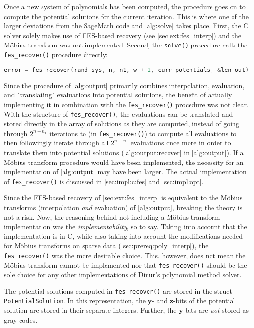 Once a new system of polynomials has been computed, the procedure goes on to compute the potential solutions for the current iteration. This is where one of the larger deviations from the SageMath code and \cref{alg:solve} takes place. First, the C solver solely makes use of FES-based recovery (see \cref{sec:ext:fes_interp}) and the Möbius transform was not implemented. Second, the \texttt{solve()} procedure calls the \texttt{fes\_recover()} procedure directly:
\begin{lstlisting}[language=c,style=mystyle]
error = fes_recover(rand_sys, n, n1, w + 1, curr_potentials, &len_out);
\end{lstlisting}

Since the procedure of \cref{alg:output} primarily combines interpolation, evaluation, and "translating" evaluations into potential solutions, the benefit of actually implementing it in combination with the \texttt{fes\_recover()} procedure was not clear. With the structure of \texttt{fes\_recover()}, the evaluations can be translated and stored directly in the array of solutions as they are computed, instead of going through $2^{n - n_1}$ iterations to (in \texttt{fes\_recover()}) to compute all evaluations to then followingly iterate through all $2^{n - n_1}$ evaluations once more in order to translate them into potential solutions (\cref{alg:output:recover} in \cref{alg:output}). If a Möbius transform procedure would have been implemented, the necessity for an implementation of \cref{alg:output} may have been larger. The actual implementation of \texttt{fes\_recover()} is discussed in \cref{sec:impl:c:fes} and \cref{sec:impl:opt}.

Since the FES-based recovery of \cref{sec:ext:fes_interp} is equivalent to the Möbius transforms (interpolation \textit{and} evaluation) of \cref{alg:output}, breaking the theory is not a risk. Now, the reasoning behind not including a Möbius transform implementation was the \textit{implementability}, so to say. Taking into account that the implementation is in C, while also taking into account the modifications needed for Möbius transforms on sparse data (\cref{sec:prereq:poly_interp}), the \texttt{fes\_recover()} was the more desirable choice. This, however, does not mean the Möbius transform cannot be implemented nor that \texttt{fes\_recover()} should be the sole choice for any other implementations of Dinur's polynomial method solver.

The potential solutions computed in \texttt{fes\_recover()} are stored in the struct \texttt{PotentialSolution}. In this representation, the $\mathbf{y}$- and $\mathbf{z}$-bits of the potential solution are stored in their separate integers. Further, the $\mathbf{y}$-bits are \textit{not} stored as gray codes.

